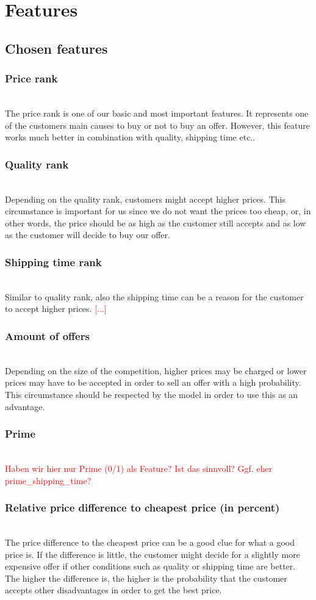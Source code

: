 \section{Features}
\subsection{Chosen features}
\subsubsection{Price rank}
\label{sec:pricerank}
	~\\
	The price rank is one of our basic and most important features. It represents one of the customers main causes to buy or not to buy an offer. However, this feature works much better in combination with quality, shipping time etc..
\subsubsection{Quality rank}
	~\\
	Depending on the quality rank, customers might accept higher prices. This circumstance is important for us since we do not want the prices too cheap, or, in other words, the price should be as high as the customer still accepts and as low as the customer will decide to buy our offer.
\subsubsection{Shipping time rank}
	~\\
	Similar to quality rank, also the shipping time can be a reason for the customer to accept higher prices. \textcolor{red}{[...]}
\subsubsection{Amount of offers}
	~\\
	Depending on the size of the competition, higher prices may be charged or lower prices may have to be accepted in order to sell an offer with a high probability. This circumstance should be respected by the model in order to use this as an advantage.
\subsubsection{Prime}
	~\\
	\textcolor{red}{Haben wir hier nur Prime (0/1) als Feature? Ist das sinnvoll? Ggf. eher prime\_shipping\_time?}
\subsubsection{Relative price difference to cheapest price (in percent)}
	~\\
	The price difference to the cheapest price can be a good clue for what a good price is. If the difference is little, the customer might decide for a slightly more expensive offer if other conditions such as quality or shipping time are better. The higher the difference is, the higher is the probability that the customer accepts other disadvantages in order to get the best price.
